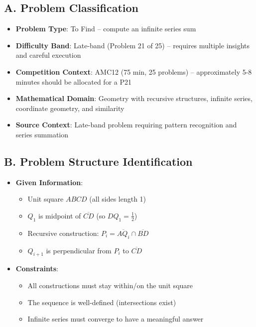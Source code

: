 \documentclass[]{article}
\begin{document}
\begin{problemconfigbox}
\subsection*{A. Problem Classification}
\begin{itemize}[leftmargin=*]
    \item \textbf{Problem Type}: To Find -- compute an infinite series sum
    \item \textbf{Difficulty Band}: Late-band (Problem 21 of 25) -- requires multiple insights and careful execution
    \item \textbf{Competition Context}: AMC12 (75 min, 25 problems) -- approximately 5-8 minutes should be allocated for a P21
    \item \textbf{Mathematical Domain}: Geometry with recursive structures, infinite series, coordinate geometry, and similarity
    \item \textbf{Source Context}: Late-band problem requiring pattern recognition and series summation
\end{itemize}

\subsection*{B. Problem Structure Identification}
\begin{itemize}[leftmargin=*]
    \item \textbf{Given Information}:
    \begin{itemize}
        \item Unit square $ABCD$ (all sides length 1)
        \item $Q_1$ is midpoint of $\overline{CD}$ (so $DQ_1 = \frac{1}{2}$)
        \item Recursive construction: $P_i = \overline{AQ_i} \cap \overline{BD}$
        \item $Q_{i+1}$ is perpendicular from $P_i$ to $\overline{CD}$
    \end{itemize}
    
    \item \textbf{Constraints}:
    \begin{itemize}
        \item All constructions must stay within/on the unit square
        \item The sequence is well-defined (intersections exist)
        \item Infinite series must converge to have a meaningful answer
    \end{itemize}
    

\end{itemize}
\end{problemconfigbox}
\end{document}
